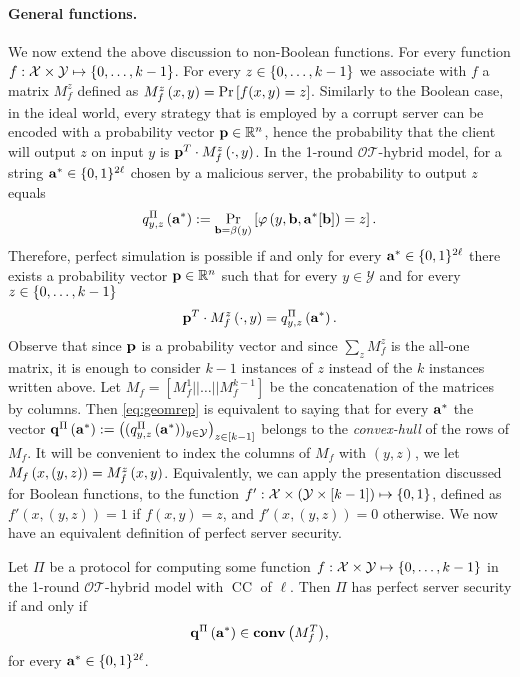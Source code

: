 \documentclass{llncs}
\newcommand{\OTfunc}{\mathcal{OT}}
\newcommand{\OThybrid}{\OTfunc\mbox{-}\text{hybrid}}
\newcommand{\X}{\mathcal{X}}
\newcommand{\Y}{\mathcal{Y}}
\renewcommand{\Z}{\set{0,\ldots,k-1}}
\newcommand{\CH}[1]{\normalfont{\mathbf{conv}\of{#1}}}
\newcommand{\p}{\myvec{p}}
\renewcommand{\q}{\myvec{q}}
\renewcommand{\b}{\myvec{b}}
\renewcommand{\a}{\myvec{a}}
\newcommand{\clnt}{\beta}
\newcommand{\local}{\varphi}
\newcommand{\CC}{\operatorname{CC}}
\begin{document}
\paragraph{General functions.}
We now extend the above discussion to non-Boolean functions. For every function $f:\X\times\Y\mapsto\Z$. For every $z\in\Z$ we associate with $f$ a matrix $M_f^{z}$ defined as $M_f^z\left ( x,y \right )=\Pr\left[f(x,y)=z\right]$.
Similarly to the Boolean case, in the ideal world, every strategy that is employed by a corrupt server can be encoded with a probability vector $\p\in\R^{n}$, hence the probability that the client will output $z$ on input $y$ is $\p^T\cdot M_f^z\of{\cdot,y}$. In the 1-round $\OThybrid$ model, for a string ${\bf a}^*\in\{0,1\}^{2\ell}$ chosen by a malicious server, the probability to output $z$ equals
$$q^{\Pi}_{y,z}\of{\a^*}:=\Pr_{\b=\clnt\of{y}}\left[\local\of{y,\b,\a^*[\b]}=z\right].$$ 
Therefore, perfect simulation is possible if and only for every $\a^*\in\zo^{2\ell}$ there exists a probability vector $\p\in\R^n$ such that for every $y\in\Y$ and for every $z\in\Z$
\begin{align}\label{eq:geomrep}
\p^T\cdot M^z_f\of{\cdot,y}=q^{\Pi}_{y,z}\of{\a^*}.
\end{align}
Observe that since $\p$ is a probability vector and since $\sum_z M_f^z$ is the all-one matrix, it is enough to consider $k-1$ instances of $z$ instead of the $k$ instances written above. Let $M_f=\left[M_f^{1}||\ldots||M_f^{k-1}\right]$ be the concatenation of the matrices by columns. Then \cref{eq:geomrep} is equivalent to saying that for every $\a^*$ the vector $\q^{\Pi}\of{\a^*}:=\left((q^{\Pi}_{y,z}\of{\a^*})_{y\in\Y}\right)_{z\in[k-1]}$ belongs to the \emph{convex-hull} of the rows of $M_f$. It will be convenient to index the columns of $M_f$ with $(y,z)$, \ie we let $M_f\left ( x,(y,z) \right )=M_f^z\left ( x,y \right )$. Equivalently, we can apply the presentation discussed for Boolean functions, to the function $f':\X\times\left(\Y\times[k-1]\right)\mapsto\zo$, defined as $f'(x,(y,z))=1$ if $f(x,y)=z$, and $f'(x,(y,z))=0$ otherwise. We now have an equivalent definition of perfect server security.

\begin{lemma}\label{lem:srvrsec}
Let $\Pi$ be a protocol for computing some function $f:\X\times\Y\mapsto\Z$ in the 1-round $\OThybrid$ model with $\CC$ of $\ell$. Then $\Pi$ has perfect server security if and only if $$\q^{\Pi}\of{\a^*}\in\CH{M_f^T},$$
for every $\a^*\in\zo^{2\ell}$.
\end{lemma}
\end{document}
